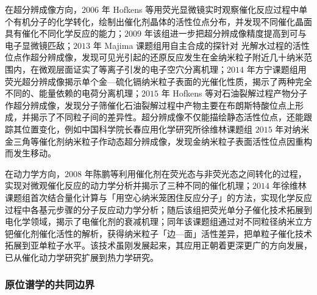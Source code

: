 在超分辨成像方向，$2006$ 年 Hofkens 等用荧光显微镜实时观察催化反应过程中单个有机分子的化学转化，绘制出催化剂晶体的活性位点分布，并发现不同催化晶面具有催化不同化学反应的能力；$2009$ 年该组进一步把超分辨成像精度提高到可与电子显微镜匹敌；$2013$ 年 Majima 课题组用自主合成的探针对  光解水过程的活性位点作超分辨成像，发现可见光引起的还原反应发生在金纳米粒子附近几十纳米范围内，在微观层面证实了等离子引发的电子空穴分离机理；$2014$ 年方宁课题组用荧光超分辨成像揭示单个金—硫化镉纳米粒子表面的光催化性质，揭示了两种完全不同的、能量依赖的电荷分离机理；$2015$ 年 Hofkens 等对石油裂解过程产物分子作超分辨成像，发现分子筛催化石油裂解过程中产物主要在布朗斯特酸位点上形成，并揭示了不同粒子间的差异性。超分辨成像不仅能描绘静态活性位点，还能跟踪其位置变化，例如中国科学院长春应用化学研究所徐维林课题组 $2015$ 年对纳米金三角等催化剂纳米粒子作动态超分辨成像，发现金纳米粒子表面活性位点因重构而发生移动。

在动力学方向，$2008$ 年陈鹏等利用催化剂在荧光态与非荧光态之间转化的过程，实现对微观催化反应的动力学分析并揭示了三种不同的催化机理；$2014$ 年徐维林课题组首次结合量化计算与「用空心纳米笼困住反应分子」的方法，实现化学反应过程中各基元步骤的分子反应动力学分析；随后该组把荧光单分子催化技术拓展到电化学领域，揭示了电催化剂的衰减机理；同年该课题组通过对不同粒径纳米立方钯催化剂催化活性的解析，获得纳米粒子「边—面」活性差异，把单粒子催化技术拓展到亚单粒子水平。该技术虽刚发展起来，其应用正朝着更深更广的方向发展，已从催化动力学研究扩展到热力学研究。

\subsubsection{原位谱学的共同边界}

